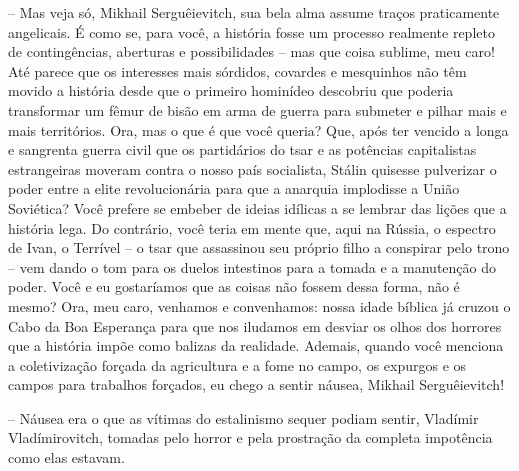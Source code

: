 -- Mas veja só, Mikhail Serguêievitch, sua bela alma assume traços
praticamente angelicais. É como se, para você, a história fosse um
processo realmente repleto de contingências, aberturas e possibilidades
-- mas que coisa sublime, meu caro! Até parece que os interesses mais
sórdidos, covardes e mesquinhos não têm movido a história desde que o
primeiro hominídeo descobriu que poderia transformar um fêmur de bisão
em arma de guerra para submeter e pilhar mais e mais territórios. Ora,
mas o que é que você queria? Que, após ter vencido a longa e sangrenta
guerra civil que os partidários do tsar e as potências capitalistas
estrangeiras moveram contra o nosso país socialista, Stálin quisesse
pulverizar o poder entre a elite revolucionária para que a anarquia
implodisse a União Soviética? Você prefere se embeber de ideias idílicas
a se lembrar das lições que a história lega. Do contrário, você teria em
mente que, aqui na Rússia, o espectro de Ivan, o Terrível -- o tsar que
assassinou seu próprio filho a conspirar pelo trono -- vem dando o tom
para os duelos intestinos para a tomada e a manutenção do poder. Você e
eu gostaríamos que as coisas não fossem dessa forma, não é mesmo? Ora,
meu caro, venhamos e convenhamos: nossa idade bíblica já cruzou o Cabo
da Boa Esperança para que nos iludamos em desviar os olhos dos horrores
que a história impõe como balizas da realidade. Ademais, quando você
menciona a coletivização forçada da agricultura e a fome no campo, os
expurgos e os campos para trabalhos forçados, eu chego a sentir náusea,
Mikhail Serguêievitch!

-- Náusea era o que as vítimas do estalinismo sequer podiam sentir,
Vladímir Vladímirovitch, tomadas pelo horror e pela prostração da
completa impotência como elas estavam.

